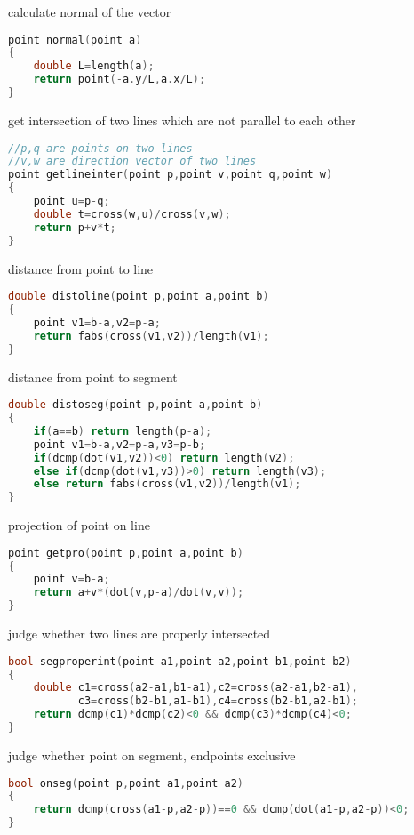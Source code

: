 calculate normal of the vector
  \begin{lstlisting}[language=C++]
point normal(point a)  
{  
    double L=length(a);  
    return point(-a.y/L,a.x/L);  
}  
  \end{lstlisting}

get intersection of two lines which are not parallel to each other
  \begin{lstlisting}[language=C++]
//p,q are points on two lines
//v,w are direction vector of two lines
point getlineinter(point p,point v,point q,point w)  
{  
    point u=p-q;  
    double t=cross(w,u)/cross(v,w);  
    return p+v*t;  
}
  \end{lstlisting}

distance from point to line
  \begin{lstlisting}[language=C++]
double distoline(point p,point a,point b)  
{  
    point v1=b-a,v2=p-a;  
    return fabs(cross(v1,v2))/length(v1);  
}
  \end{lstlisting}

distance from point to segment
  \begin{lstlisting}[language=C++]
double distoseg(point p,point a,point b)  
{  
    if(a==b) return length(p-a);  
    point v1=b-a,v2=p-a,v3=p-b;  
    if(dcmp(dot(v1,v2))<0) return length(v2);  
    else if(dcmp(dot(v1,v3))>0) return length(v3);  
    else return fabs(cross(v1,v2))/length(v1);  
}
  \end{lstlisting}

projection of point on line
  \begin{lstlisting}[language=C++]
point getpro(point p,point a,point b)  
{  
    point v=b-a;  
    return a+v*(dot(v,p-a)/dot(v,v));  
}
  \end{lstlisting}

judge whether two lines are properly intersected
  \begin{lstlisting}[language=C++]
bool segproperint(point a1,point a2,point b1,point b2)  
{  
    double c1=cross(a2-a1,b1-a1),c2=cross(a2-a1,b2-a1),  
           c3=cross(b2-b1,a1-b1),c4=cross(b2-b1,a2-b1);  
    return dcmp(c1)*dcmp(c2)<0 && dcmp(c3)*dcmp(c4)<0;  
}
  \end{lstlisting}

judge whether point on segment, endpoints exclusive
  \begin{lstlisting}[language=C++]
bool onseg(point p,point a1,point a2)  
{  
    return dcmp(cross(a1-p,a2-p))==0 && dcmp(dot(a1-p,a2-p))<0;  
}
  \end{lstlisting}

